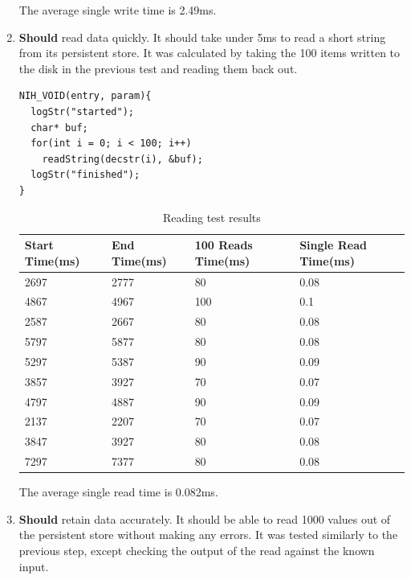 \documentclass{article}
\begin{document}
\begin{enumerate}
The average single write time is 2.49ms.

\item \textbf{Should} read data quickly. It should take under 5ms to read a short string from its persistent store. It was calculated by taking the 100 items written to the disk in the previous test and reading them back out.

\begin{tcolorbox}[colback=white,grow to left by=2.5mm,grow to right by=2.5mm,left*=0mm,right*=0mm,sharp corners]
\begin{verbatim}
NIH_VOID(entry, param){
  logStr("started");
  char* buf;
  for(int i = 0; i < 100; i++)
    readString(decstr(i), &buf);
  logStr("finished");
}
\end{verbatim}
\end{tcolorbox}

\begin{table}[H]
\begin{tabular}{|l|l|l|l|}
\hline
Start Time(ms)		&End Time(ms)				&100 Reads Time(ms)		&Single Read Time(ms)		\\ \hline
2697	 & 2777	 & 80	 & 0.08\\ \hline
4867	 & 4967	 & 100	 & 0.1\\ \hline
2587	 & 2667	 & 80	 & 0.08\\ \hline
5797	 & 5877	 & 80	 & 0.08\\ \hline
5297	 & 5387	 & 90	 & 0.09\\ \hline
3857	 & 3927	 & 70	 & 0.07\\ \hline
4797	 & 4887	 & 90	 & 0.09\\ \hline
2137	 & 2207	 & 70	 & 0.07\\ \hline
3847	 & 3927	 & 80	 & 0.08\\ \hline
7297	 & 7377	 & 80	 & 0.08\\ \hline
\end{tabular}
\caption{Reading test results}
\end{table}

The average single read time is 0.082ms.

\item \textbf{Should} retain data accurately. It should be able to read 1000 values out of the persistent store without making any errors. It was tested similarly to the previous step, except checking the output of the read against the known input.


\end{enumerate}
\end{document}
